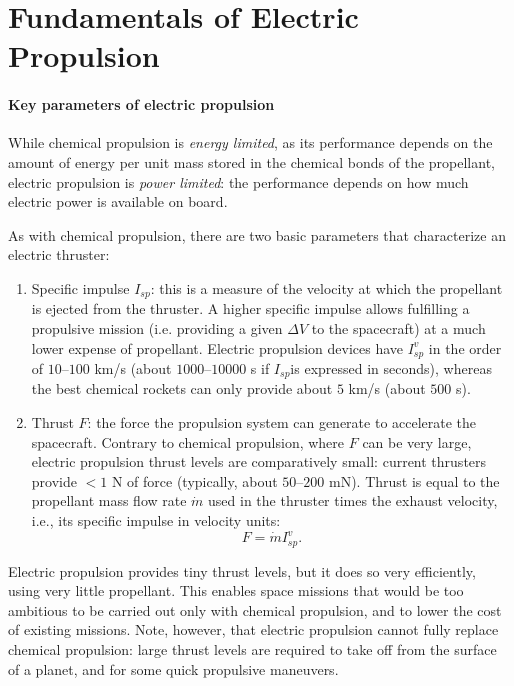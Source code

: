 \section[Electric Propulsion]{Fundamentals of Electric Propulsion}
 
\paragraph{Key parameters of electric propulsion}

While chemical propulsion is \emph{energy limited}, as its performance depends
on the amount of energy per unit mass stored in the chemical bonds of the
propellant, electric propulsion is \emph{power limited}: the performance
depends on how  much electric power is available on board.

As with chemical propulsion, there are two basic parameters that characterize 
an electric thruster:
%
\begin{enumerate}

\item Specific impulse $I_{sp}$: this is a measure of the velocity at which
the propellant is ejected from the thruster. A higher specific impulse allows
fulfilling a propulsive mission (i.e. providing a given $\Delta V$ to the
spacecraft) at a much lower expense of propellant. Electric propulsion devices
have $I_{sp}^v$ in the order of $10$--$100$ km/s (about $1000$--$10000$ s if
$I_{sp}$is expressed in seconds), whereas the best chemical rockets can only provide about $5$ km/s (about $500$ s).

\item Thrust $F$: the force the propulsion system can generate to accelerate
the spacecraft. Contrary to chemical propulsion, where $F$ can be very large,
electric propulsion thrust levels are comparatively small: current thrusters
provide $< 1$ N of force (typically, about $50$--$200$ mN).  Thrust is equal
to the propellant mass flow rate $\dot m$ used in the thruster times the
exhaust velocity, i.e., its specific impulse in velocity units: 
%
\begin{equation}
F=\dot m I_{sp}^v.    
\end{equation}


\end{enumerate}
%
Electric propulsion provides tiny thrust levels, but it does so very 
efficiently, using very little propellant. This enables space missions that 
would be too ambitious to be carried out only with chemical propulsion, and to 
lower the cost of existing missions. 
Note, however, that electric propulsion cannot fully replace chemical 
propulsion: large thrust levels are required to take off from the surface of a 
planet, and for some quick propulsive maneuvers.

